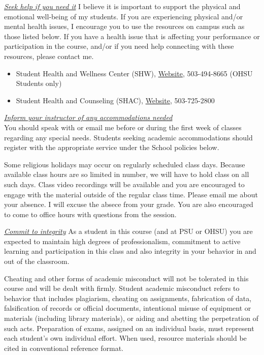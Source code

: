 \documentclass[
  letterpaper,
  DIV=11,
  numbers=noendperiod]{scrartcl}
\begin{document}
\ul{\emph{Seek help if you need it}}\textbf{\hfill\break
}I believe it is important to support the physical and emotional
well‐being of my students. If you are experiencing physical and/or
mental health issues, I encourage you to use the resources on campus
such as those listed below. If you have a health issue that is affecting
your performance or participation in the course, and/or if you need help
connecting with these resources, please contact me.

\begin{itemize}
\item
  Student Health and Wellness Center (SHW),
  \href{https://www.ohsu.edu/education/student-health-and-wellness}{Website},
  503-494-8665 (OHSU Students only)
\item
  Student Health and Counseling (SHAC),
  \href{https://www.pdx.edu/health-counseling/}{Website}, 503-725-2800
\end{itemize}

\ul{\emph{Inform your instructor of any accommodations needed}}\\
You should speak with or email me before or during the first week of
classes regarding any special needs. Students seeking academic
accommodations should register with the appropriate service under the
School policies below.

Some religious holidays may occur on regularly scheduled class days.
Because available class hours are so limited in number, we will have to
hold class on all such days. Class video recordings will be available
and you are encouraged to engage with the material outside of the
regular class time. Please email me about your absence. I will excuse
the absece from your grade. You are also encouraged to come to office
hours with questions from the session.

\ul{\emph{Commit to integrity}}\textbf{\hfill\break
}As a student in this course (and at PSU or OHSU) you are expected to
maintain high degrees of professionalism, commitment to active learning
and participation in this class and also integrity in your behavior in
and out of the classroom.

Cheating and other forms of academic misconduct will not be tolerated in
this course and will be dealt with firmly. Student academic misconduct
refers to behavior that includes plagiarism, cheating on assignments,
fabrication of data, falsification of records or official documents,
intentional misuse of equipment or materials (including library
materials), or aiding and abetting the perpetration of such acts.
Preparation of exams, assigned on an individual basis, must represent
each student's own individual effort. When used, resource materials
should be cited in conventional reference format.
\end{document}
